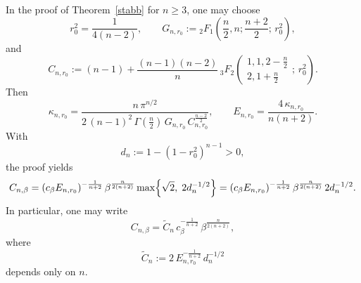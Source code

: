 \begin{numrem}
\label{rem:explicit_Cnalpha}
In the proof of Theorem~\ref{stabb} for $n\ge3$, one may choose
\[
r_0^2=\frac1{4(n-2)},\qquad
G_{n,r_0}:={}_2F_1\!\left(\frac n2,n;\frac{n+2}{2};\,r_0^2\right),
\]
and
\[
C_{n,r_0}:=(n-1)+\frac{(n-1)(n-2)}{n}\,
{}_3F_2\!\left(\begin{array}{c}
1,1,2-\frac n2\\[2pt]
2,1+\frac n2
\end{array};\,r_0^2\right).
\]
Then
\[
\kappa_{n,r_0}
=
\frac{n\,\pi^{n/2}}
{2\,(n-1)^2\,\Gamma(\frac n2)\,G_{n,r_0}\,C_{n,r_0}^{\frac{n-2}{2}}},
\qquad
E_{n,r_0}=\frac{4\,\kappa_{n,r_0}}{n(n+2)}.
\]
With
\[
d_n:=1-(1-r_0^2)^{n-1}>0,
\]
the proof yields
\[
C_{n,\beta}
=
(c_\beta E_{n,r_0})^{-\frac1{n+2}}\,
\beta^{\frac{n}{2(n+2)}}
\max\Bigl\{\sqrt2,\;2d_n^{-1/2}\Bigr\}
=
(c_\beta E_{n,r_0})^{-\frac1{n+2}}\,
\beta^{\frac{n}{2(n+2)}}
\,2d_n^{-1/2}.
\]
In particular, one may write
\[
C_{n,\beta}
=
\widetilde C_n\,
c_\beta^{-\frac1{n+2}}\,
\beta^{\frac{n}{2(n+2)}},
\]
where
\[
\widetilde C_n
:=
2\,E_{n,r_0}^{-\frac1{n+2}}\,d_n^{-1/2}
\]
depends only on $n$.
\end{numrem}

